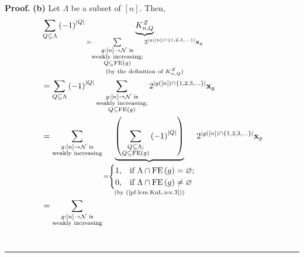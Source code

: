 \documentclass[numbers=enddot,12pt,final,onecolumn,notitlepage]{scrartcl}%
\theoremstyle{definition}
\newenvironment{proof}[1][Proof]{\noindent\textbf{#1.} }{\ \rule{0.5em}{0.5em}}
\newenvironment{verlong}{}{}
\newenvironment{vershort}{}{}
\let\sumnonlimits\sum
\renewcommand{\sum}{\sumnonlimits\limits}
\begin{document}
\begin{verlong}
\begin{proof}
% 
\textbf{(b)} Let $\Lambda$ be a subset of $\left[  n\right]  $. Then,%
\begin{align*}
&  \sum_{Q\subseteq\Lambda}\left(  -1\right)  ^{\left\vert Q\right\vert
}\underbrace{K_{n,Q}^{\mathcal{Z}}}_{\substack{=\sum_{\substack{g:\left[
n\right]  \rightarrow\mathcal{N}\text{ is}\\\text{weakly increasing;}%
\\Q\subseteq\operatorname*{FE}\left(  g\right)  }}2^{\left\vert g\left(
\left[  n\right]  \right)  \cap\left\{  1,2,3,\ldots\right\}  \right\vert
}\mathbf{x}_{g}\\\text{(by the definition of }K_{n,Q}^{\mathcal{Z}}\text{)}%
}}\\
&  =\sum_{Q\subseteq\Lambda}\left(  -1\right)  ^{\left\vert Q\right\vert }%
\sum_{\substack{g:\left[  n\right]  \rightarrow\mathcal{N}\text{
is}\\\text{weakly increasing;}\\Q\subseteq\operatorname*{FE}\left(  g\right)
}}2^{\left\vert g\left(  \left[  n\right]  \right)  \cap\left\{
1,2,3,\ldots\right\}  \right\vert }\mathbf{x}_{g}\\
&  =\sum_{\substack{g:\left[  n\right]  \rightarrow\mathcal{N}\text{
is}\\\text{weakly increasing}}}\underbrace{\left(  \sum_{\substack{Q\subseteq
\Lambda;\\Q\subseteq\operatorname*{FE}\left(  g\right)  }}\left(  -1\right)
^{\left\vert Q\right\vert }\right)  }_{\substack{=%
\begin{cases}
1, & \text{if }\Lambda\cap\operatorname*{FE}\left(  g\right)  =\varnothing;\\
0, & \text{if }\Lambda\cap\operatorname*{FE}\left(  g\right)  \neq\varnothing
\end{cases}
\\\text{(by (\ref{pf.lem.KnL.iex.3}))}}}2^{\left\vert g\left(  \left[
n\right]  \right)  \cap\left\{  1,2,3,\ldots\right\}  \right\vert }%
\mathbf{x}_{g}\\
&  =\sum_{\substack{g:\left[  n\right]  \rightarrow\mathcal{N}\text{
is}\\\text{weakly increasing}}}%

\end{align*}
\end{proof}
\end{verlong}
\end{document}
